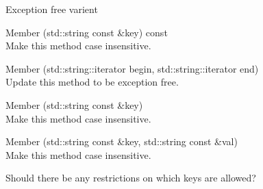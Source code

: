 \begin{DoxyRefList}
Exception free varient 
\item[Member \doxylink{classwebsocketpp_1_1http_1_1parser_1_1parser_ae8a8f833c3fb01f1553a26e77f380367}{websocketpp\+::http\+::parser\+::parser\+::get\+\_\+header} (std\+::string const \&key) const]\hfill \\
\label{todo__todo000016}%
%
Make this method case insensitive. 
\item[Member \doxylink{classwebsocketpp_1_1http_1_1parser_1_1parser_a4dbb443fd916f8b4306e7afdb2e8ff45}{websocketpp\+::http\+::parser\+::parser\+::process\+\_\+header} (std\+::string\+::iterator begin, std\+::string\+::iterator end)]\hfill \\
\label{todo__todo000020}%
%
Update this method to be exception free. 
\item[Member \doxylink{classwebsocketpp_1_1http_1_1parser_1_1parser_a64ff49a6a1ddbf70b9767874ffdd513e}{websocketpp\+::http\+::parser\+::parser\+::remove\+\_\+header} (std\+::string const \&key)]\hfill \\
\label{todo__todo000019}%
%
Make this method case insensitive. 
\item[Member \doxylink{classwebsocketpp_1_1http_1_1parser_1_1parser_aba2991b2aa41ca60d9427950502b0b93}{websocketpp\+::http\+::parser\+::parser\+::replace\+\_\+header} (std\+::string const \&key, std\+::string const \&val)]\hfill \\
\label{todo__todo000018}%
%
Make this method case insensitive. 



Should there be any restrictions on which keys are allowed? 




\end{DoxyRefList}
